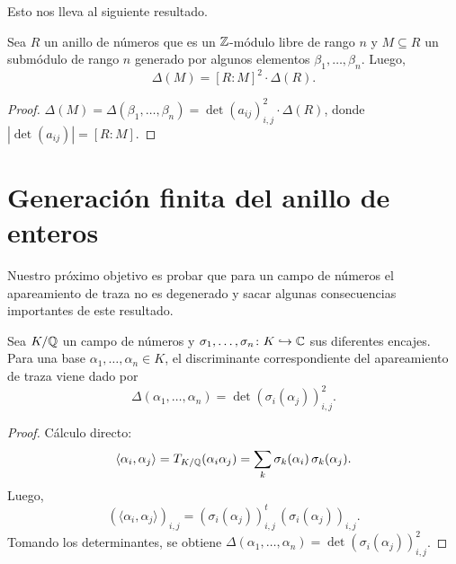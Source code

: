 Esto nos lleva al siguiente resultado.

\begin{proposicion}
  \label{prop:discriminantes-e-indice}
  Sea $R$ un anillo de números que es un $\mathbb{Z}$-módulo libre de rango $n$
  y $M \subseteq R$ un submódulo de rango $n$ generado por algunos elementos
  $\beta_1,\ldots,\beta_n$. Luego,
  $$\Delta (M) = [R : M]^2 \cdot \Delta (R).$$

  \begin{proof}
    $\Delta (M) = \Delta (\beta_1,\ldots,\beta_n) = \det (a_{ij})_{i,j}^2 \cdot \Delta (R)$,
    donde $|\det (a_{ij})| = [R : M]$.
  \end{proof}
\end{proposicion}


\section{Generación finita del anillo de enteros}

Nuestro próximo objetivo es probar que para un campo de números
el apareamiento de traza no es degenerado y sacar algunas consecuencias
importantes de este resultado.

\begin{lema}
  \label{lema:discriminante-en-terminos-de-encajes}
  Sea $K/\mathbb{Q}$ un campo de números y
  $\sigma_1,\ldots,\sigma_n\colon K \hookrightarrow \mathbb{C}$ sus diferentes encajes.
  Para una base $\alpha_1,\ldots,\alpha_n \in K$, el discriminante
  correspondiente del apareamiento de traza viene dado por
  $$\Delta (\alpha_1,\ldots,\alpha_n) = \det (\sigma_i (\alpha_j))_{i,j}^2.$$

  \begin{proof}
    Cálculo directo:
    \[ \langle\alpha_i,\alpha_j\rangle = T_{K/\mathbb{Q}} (\alpha_i \alpha_j) =
       \sum_k \sigma_k (\alpha_i)\,\sigma_k (\alpha_j). \]
    Luego,
    \[ (\langle\alpha_i,\alpha_j\rangle)_{i,j} =
       (\sigma_i (\alpha_j))_{i,j}^t\,(\sigma_i (\alpha_j))_{i,j}. \]
    Tomando los determinantes, se obtiene
    $\Delta (\alpha_1,\ldots,\alpha_n) = \det (\sigma_i (\alpha_j))_{i,j}^2$.
  \end{proof}
\end{lema}

